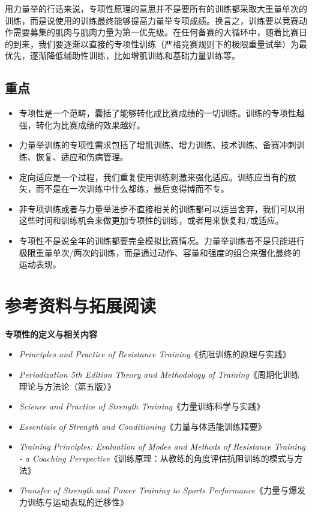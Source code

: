 \documentclass[fontset=fandol, a4paper, 12pt, openright]{ctexbook}
\begin{document}
用力量举的行话来说，专项性原理的意思并不是要所有的训练都采取大重量单次的训练，而是说使用的训练最终能够提高力量举专项成绩。换言之，训练要以竞赛动作需要募集的肌肉与肌肉力量为第一优先级。在任何备赛的大循环中，随着比赛日的到来，我们要逐渐以直接的专项性训练（严格竞赛规则下的极限重量试举）为最优先，逐渐降低辅助性训练，比如增肌训练和基础力量训练等。

\subsection*{重点}
\begin{itemize}
    \item 专项性是一个范畴，囊括了能够转化成比赛成绩的一切训练。训练的专项性越强，转化为比赛成绩的效果越好。
    \item 力量举训练的专项性需求包括了增肌训练、增力训练、技术训练、备赛冲刺训练、恢复、适应和伤病管理。
    \item 定向适应是一个过程，我们重复使用训练刺激来强化适应。训练应当有的放矢，而不是在一次训练中什么都练，最后变得博而不专。
    \item 非专项训练或者与力量举进步不直接相关的训练都可以适当舍弃，我们可以用这些时间和训练机会来做更加专项性的训练，或者用来恢复和/或适应。
    \item 专项性不是说全年的训练都要完全模拟比赛情况。力量举训练者不是只能进行极限重量单次/两次的训练，而是通过动作、容量和强度的组合来强化最终的运动表现。
\end{itemize}

\section{参考资料与拓展阅读}

\textbf{专项性的定义与相关内容}
\begin{itemize}
    \item \textit{Principles and Practice of Resistance Training}《抗阻训练的原理与实践》
    \item \textit{Periodization 5th Edition Theory and Methodology of Training}《周期化训练理论与方法论（第五版）》
    \item \textit{Science and Practice of Strength Training}《力量训练科学与实践》
    \item \textit{Essentials of Strength and Conditioning}《力量与体适能训练精要》
    \item \textit{Training Principles: Evaluation of Modes and Methods of Resistance Training - a Coaching Perspective}《训练原理：从教练的角度评估抗阻训练的模式与方法》
    \item \textit{Transfer of Strength and Power Training to Sports Performance}《力量与爆发力训练与运动表现的迁移性》
\end{itemize}
\end{document}
